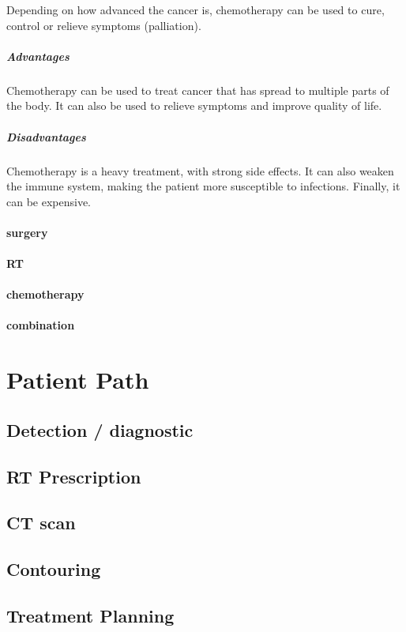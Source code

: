 Depending on how advanced the cancer is, chemotherapy can be used to cure, control or relieve symptoms (palliation).

\subparagraph{Advantages}
Chemotherapy can be used to treat cancer that has spread to multiple parts of the body.
It can also be used to relieve symptoms and improve quality of life.

\subparagraph{Disadvantages}
Chemotherapy is a heavy treatment, with strong side effects.
It can also weaken the immune system, making the patient more susceptible to infections.
Finally, it can be expensive.

\paragraph{surgery}
\paragraph{RT}
\paragraph{chemotherapy}
\paragraph{combination}

\section{Patient Path}

\subsection{Detection / diagnostic}
\subsection{RT Prescription}
\subsection{CT scan}
\subsection{Contouring}
\subsection{Treatment Planning}
